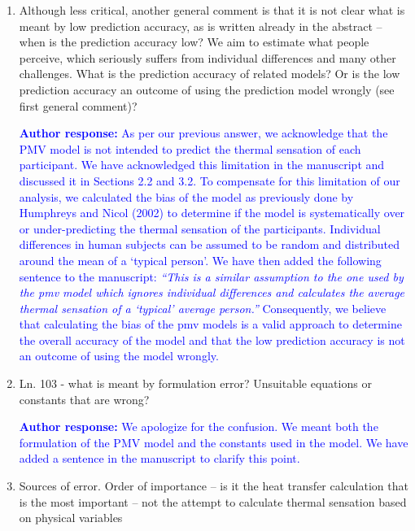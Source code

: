 \documentclass[a4paper, 10pt]{letter}
\newcommand{\response}[1]{\textcolor{blue}{\textbf{Author response:} #1}}
\begin{document}
\begin{letter}
\begin{enumerate}
            \item Although less critical, another general comment is that it is not clear what is meant by low prediction accuracy, as is written already in the abstract -- when is the prediction accuracy low?
            We aim to estimate what people perceive, which seriously suffers from individual differences and many other challenges.
            What is the prediction accuracy of related models?
            Or is the low prediction accuracy an outcome of using the prediction model wrongly (see first general comment)?

            \response{
                As per our previous answer, we acknowledge that the PMV model is not intended to predict the thermal sensation of each participant.
                We have acknowledged this limitation in the manuscript and discussed it in Sections 2.2 and 3.2.
                To compensate for this limitation of our analysis, we calculated the bias of the model as previously done by Humphreys and Nicol (2002) to determine if the model is systematically over or under-predicting the thermal sensation of the participants.
                Individual differences in human subjects can be assumed to be random and distributed around the mean of a `typical person'.
                We have then added the following sentence to the manuscript: \textit{``This is a similar assumption to the one used by the \ac{pmv} model which ignores individual differences and calculates the average thermal sensation of a `typical' average person.''}
                Consequently, we believe that calculating the bias of the \ac{pmv} models is a valid approach to determine the overall accuracy of the model and that the low prediction accuracy is not an outcome of using the model wrongly.
            }

            \item Ln. 103 - what is meant by formulation error?
            Unsuitable equations or constants that are wrong?

            \response{
                We apologize for the confusion.
                We meant both the formulation of the PMV model and the constants used in the model.
                We have added a sentence in the manuscript to clarify this point.
            }

            \item Sources of error.
            Order of importance -- is it the heat transfer calculation that is the most important -- not the attempt to calculate thermal sensation based on physical variables


\end{enumerate}
\end{letter}
\end{document}
